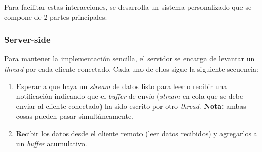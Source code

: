 Para facilitar estas interacciones, se desarrolla un sistema personalizado que se compone de 2 partes principales:

\subsubsection*{Server-side}
Para mantener la implementación sencilla, el servidor se encarga de levantar un \emph{thread} por cada cliente conectado. Cada uno de ellos sigue la siguiente secuencia:

\begin{enumerate}
	\item Esperar a que haya un \emph{stream} de datos listo para leer o recibir una notificación indicando que el \emph{buffer} de envío (\emph{stream} en cola que se debe enviar al cliente conectado) ha sido escrito por otro \emph{thread}. \textbf{Nota:} ambas cosas pueden pasar simultáneamente.
	\item Recibir los datos desde el cliente remoto (leer datos recibidos) y agregarlos a un \emph{buffer} acumulativo.
\end{enumerate}
